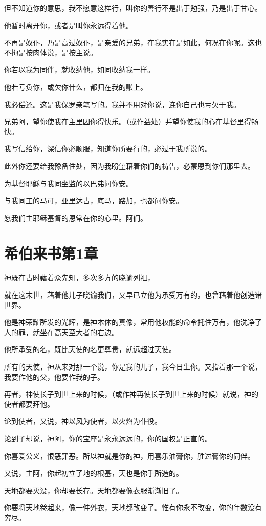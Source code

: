 \documentclass[12pt,oneside]{book}
\begin{document}
但不知道你的意思，我不愿意这样行，叫你的善行不是出于勉强，乃是出于甘心。

他暂时离开你，或者是叫你永远得着他。

不再是奴仆，乃是高过奴仆，是亲爱的兄弟，在我实在是如此，何况在你呢。这也不拘是按肉体说，是按主说。

你若以我为同伴，就收纳他，如同收纳我一样。

他若亏负你，或欠你什么，都归在我的账上。

我必偿还。这是我保罗亲笔写的。我并不用对你说，连你自己也亏欠于我。

兄弟阿，望你使我在主里因你得快乐。（或作益处）并望你使我的心在基督里得畅快。

我写信给你，深信你必顺服，知道你所要行的，必过于我所说的。

此外你还要给我豫备住处，因为我盼望藉着你们的祷告，必蒙恩到你们那里去。

为基督耶稣与我同坐监的以巴弗问你安。

与我同工的马可，亚里达古，底马，路加，也都问你安。

愿我们主耶稣基督的恩常在你的心里。阿们。

\chapter{希伯来书第1章}
神既在古时藉着众先知，多次多方的晓谕列祖，

就在这末世，藉着他儿子晓谕我们，又早已立他为承受万有的，也曾藉着他创造诸世界。

他是神荣耀所发的光辉，是神本体的真像，常用他权能的命令托住万有，他洗净了人的罪，就坐在高天至大者的右边。

他所承受的名，既比天使的名更尊贵，就远超过天使。

所有的天使，神从来对那一个说，你是我的儿子，我今日生你。又指着那一个说，我要作他的父，他要作我的子。

再者，神使长子到世上来的时候，（或作神再使长子到世上来的时候）就说，神的使者都要拜他。

论到使者，又说，神以风为使者，以火焰为仆役。

论到子却说，神阿，你的宝座是永永远远的，你的国权是正直的。

你喜爱公义，恨恶罪恶。所以神就是你的神，用喜乐油膏你，胜过膏你的同伴。

又说，主阿，你起初立了地的根基，天也是你手所造的。

天地都要灭没，你却要长存。天地都要像衣服渐渐旧了。

你要将天地卷起来，像一件外衣，天地都改变了。惟有你永不改变，你的年数没有穷尽。
\end{document}
